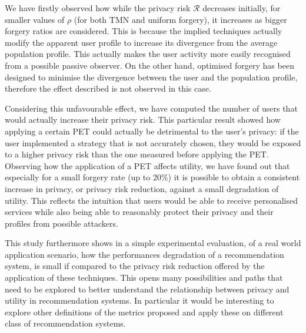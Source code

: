 We have firstly observed how while the privacy risk $\mathcal{R}$  decreases initially, for smaller values of $\rho$ (for both TMN and uniform forgery), it increases as bigger forgery ratios are considered. This is because the implied techniques actually modify the apparent user profile to increase its divergence from the average population profile. This actually makes the user activity more easily recognised from a possible passive observer. On the other hand, optimised forgery has been designed to minimise the divergence between the user and the population profile, therefore the effect described is not observed in this case.

Considering this unfavourable effect, we have computed the number of users that would actually increase their privacy risk. This particular result showed how applying a certain PET could actually be detrimental to the user's privacy: if the user implemented a strategy that is not accurately chosen, they would be exposed to a higher privacy risk than the one measured before applying the PET.
Observing how the application of a PET affects utility, we have found out that especially for a small forgery rate (up to 20\%) it is possible to obtain a consistent increase in privacy, or privacy risk reduction, against a small degradation of utility. This reflects the intuition that users would be able to receive personalised services while also being able to reasonably protect their privacy and their profiles from possible attackers.

This study furthermore shows in a simple experimental evaluation, of a real world application scenario, how the performances degradation of a recommendation system, is small if compared to the privacy risk reduction offered by the application of these techniques. This opens many possibilities and paths that need to be explored to better understand the relationship between privacy and utility in recommendation systems. In particular it would be interesting to explore other definitions of the metrics proposed and apply these on different class of recommendation systems.
